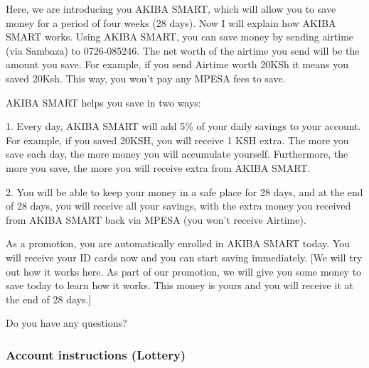\documentclass[11pt]{article}
\begin{document}
            {\setlength{\parskip}{1em} \setlength{\parindent}{0em}

            Here, we are introducing you AKIBA SMART, which will allow you to save money for a period of four weeks (28 days). Now I will explain how AKIBA SMART works. Using AKIBA SMART, you can save money by sending airtime (via Sambaza) to 0726-085246. The net worth of the airtime you send will be the amount you save. For example, if you send Airtime worth 20KSh it means you saved 20Ksh. This way, you won't pay any MPESA fees to save.

            AKIBA SMART helps you save in two ways:

            1. Every day, AKIBA SMART will add 5\% of your daily savings to your account. For example, if you saved 20KSH, you will receive 1 KSH extra. The more you save each day, the more money you will accumulate yourself. Furthermore, the more you save, the more you will receive extra from AKIBA SMART.

            2. You will be able to keep your money in a safe place for 28 days, and at the end of 28 days, you will receive all your savings, with the extra money you received from AKIBA SMART back via MPESA (you won't receive Airtime).

            As a promotion, you are automatically enrolled in AKIBA SMART today. You will receive your ID cards now and you can start saving immediately. [We will try out how it works here. As part of our promotion, we will give you some money to save today to learn how it works. This money is yours and you will receive it at the end of 28 days.]

            Do you have any questions?

            }

        \subsubsection{Account instructions (Lottery)}
\end{document}
